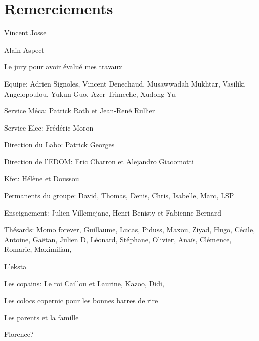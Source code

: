 \chapter*{Remerciements}

Vincent Josse

Alain Aspect

Le jury pour avoir évalué mes travaux

Equipe: Adrien Signoles, Vincent Denechaud, Musawwadah Mukhtar, Vasiliki Angelopoulou, Yukun Guo, Azer Trimeche, Xudong Yu

Service Méca: Patrick Roth et Jean-René Rullier

Service Elec: Frédéric Moron

Direction du Labo: Patrick Georges

Direction de l'EDOM: Eric Charron et Alejandro Giacomotti

Kfet: Hélène et Doussou

Permanents du groupe: David, Thomas, Denis, Chris, Isabelle, Marc, LSP

Enseignement: Julien Villemejane, Henri Benisty et Fabienne Bernard

Thésards: Momo forever, Guillaume, Lucas, Piduss, Maxou, Ziyad, Hugo, Cécile, Antoine, Gaëtan, Julien D, Léonard, Stéphane, Olivier, Anaïs, Clémence, Romaric, Maximilian, 

L'eksta

Les copains: Le roi Caillou et Laurine, Kazoo, Didi, 

Les colocs copernic pour les bonnes barres de rire

Les parents et la famille

Florence?


